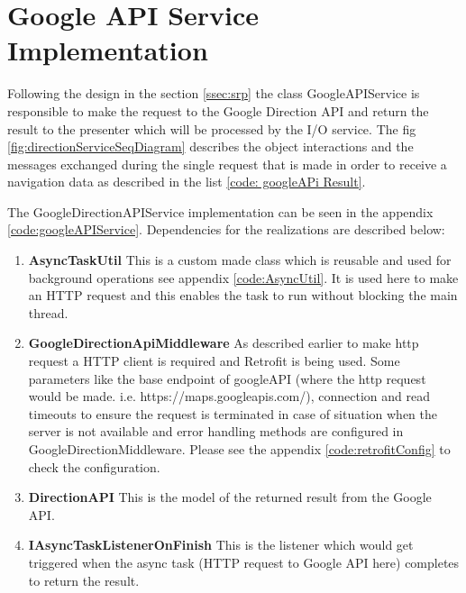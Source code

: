 
\section{Google API Service Implementation}
    Following the design in the section \ref{ssec:srp} the class 
    GoogleAPIService is responsible to make the request to the Google
    Direction API and return the result to the presenter which will be
    processed by the I/O service. The fig \ref{fig:directionServiceSeqDiagram}
    describes the object interactions and the messages exchanged during the
    single request that is made in order to receive a navigation data as described in
    the list \ref{code: googleAPi Result}.
    
    \par
        The GoogleDirectionAPIService implementation can be seen in
        the appendix \ref{code:googleAPIService}.
        Dependencies for the realizations are described below:
        \begin{enumerate}
            \item  
                \textbf{AsyncTaskUtil}
                    This is a custom made class which is reusable and used for background
                    operations see appendix \ref{code:AsyncUtil}. It is used here to make an HTTP request and this enables
                    the task to run without blocking the main thread. 
            \item  
                \textbf{GoogleDirectionApiMiddleware}
                As described earlier to make http request a HTTP client 
                is required and Retrofit
                is being used. Some parameters like the base endpoint of googleAPI 
                (where the http
                request would be made. i.e. https://maps.googleapis.com/), 
                connection and read timeouts
                to ensure the request is terminated 
                in case of situation when the server is not available 
                and error handling methods are configured in 
                GoogleDirectionMiddleware. Please see the appendix 
                \ref{code:retrofitConfig} to check the configuration. 
            \item  
                \textbf{DirectionAPI}
                    This is the model of the returned result from the Google
                    API.
            \item  
                \textbf{IAsyncTaskListenerOnFinish}
                    This is the listener which would get triggered when the
                    async task (HTTP request to Google API here) completes to
                    return the result.
        \end{enumerate}       
        



    